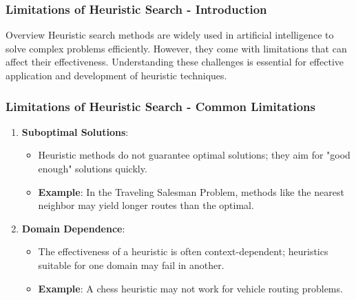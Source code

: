 \documentclass[aspectratio=169]{beamer}
\begin{document}
\begin{frame}[fragile]
    \frametitle{Limitations of Heuristic Search - Introduction}
    \begin{block}{Overview}
        Heuristic search methods are widely used in artificial intelligence to solve complex problems efficiently. However, they come with limitations that can affect their effectiveness. Understanding these challenges is essential for effective application and development of heuristic techniques.
    \end{block}
\end{frame}

\begin{frame}[fragile]
    \frametitle{Limitations of Heuristic Search - Common Limitations}
    \begin{enumerate}
        \item \textbf{Suboptimal Solutions}:
        \begin{itemize}
            \item Heuristic methods do not guarantee optimal solutions; they aim for "good enough" solutions quickly.
            \item \textbf{Example}: In the Traveling Salesman Problem, methods like the nearest neighbor may yield longer routes than the optimal.
        \end{itemize}

        \item \textbf{Domain Dependence}:
        \begin{itemize}
            \item The effectiveness of a heuristic is often context-dependent; heuristics suitable for one domain may fail in another.
            \item \textbf{Example}: A chess heuristic may not work for vehicle routing problems.
        \end{itemize}
    \end{enumerate}
\end{frame}
\end{document}
